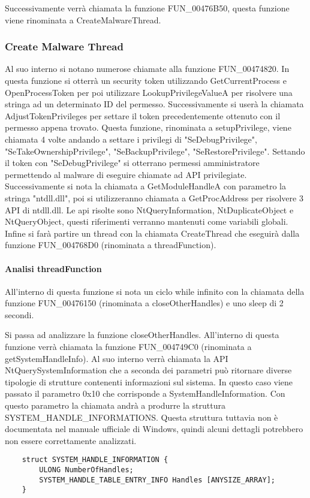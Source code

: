 \documentclass[a4paper,12pt]{article}
\begin{document}
Successivamente verrà chiamata la funzione FUN\_00476B50, questa funzione viene rinominata a CreateMalwareThread. 

\subsubsection{Create Malware Thread}
Al suo interno si notano numerose chiamate alla funzione FUN\_00474820. In questa funzione si otterrà un security token utilizzando GetCurrentProcess e OpenProcessToken per poi utilizzare LookupPrivilegeValueA per risolvere una stringa ad un determinato ID del permesso. Successivamente si userà la chiamata AdjustTokenPrivileges per settare il token precedentemente ottenuto con il permesso appena trovato. Questa funzione, rinominata a setupPrivilege, viene chiamata 4 volte andando a settare i privilegi di "SeDebugPrivilege", "SeTakeOwnershipPrivilege", "SeBackupPrivilege", "SeRestorePrivilege".  Settando il token con "SeDebugPrivilege" si otterrano permessi amministratore permettendo al malware di eseguire chiamate ad API privilegiate.  
Successivamente si nota la chiamata a GetModuleHandleA con parametro la stringa "ntdll.dll", poi si utilizzeranno chiamata a GetProcAddress per risolvere 3 API di ntdll.dll. Le api risolte sono NtQueryInformation, NtDuplicateObject e NtQueryObject, questi riferimenti verranno mantenuti come variabili globali. Infine si farà partire un thread con la chiamata CreateThread che eseguirà dalla funzione FUN\_004768D0 (rinominata a threadFunction).

\paragraph{Analisi threadFunction}
All'interno di questa funzione si nota un ciclo while infinito con la chiamata della funzione FUN\_00476150 (rinominata a closeOtherHandles) e uno sleep di 2 secondi.

Si passa ad analizzare la funzione closeOtherHandles. All'interno di questa funzione verrà chiamata la funzione FUN\_004749C0 (rinominata a getSystemHandleInfo). Al suo interno verrà chiamata la API NtQuerySystemInformation che a seconda dei parametri può ritornare diverse tipologie di strutture contenenti informazioni sul sistema. In questo caso viene passato il parametro 0x10 che corrisponde a SystemHandleInformation. Con questo parametro la chiamata andrà a produrre la struttura \\SYSTEM\_HANDLE\_INFORMATIONS. Questa struttura tuttavia non è documentata nel manuale ufficiale di Windows, quindi alcuni dettagli potrebbero non essere correttamente analizzati.
\begin{verbatim}
	struct SYSTEM_HANDLE_INFORMATION {
		ULONG NumberOfHandles;
		SYSTEM_HANDLE_TABLE_ENTRY_INFO Handles [ANYSIZE_ARRAY];
	}
\end{verbatim}
\end{document}
